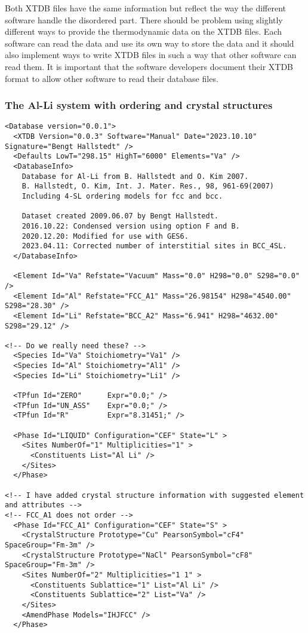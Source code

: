 \documentclass{article}
\begin{document}
\begin{appendices}
Both XTDB files have the same information but reflect the way the
different software handle the disordered part.  There should be
problem using slightly different ways to provide the thermodynamic
data on the XTDB files.  Each software can read the data and use its
own way to store the data and it should also implement ways to write
XTDB files in such a way that other software can read them.  It is
important that the software developers document their XTDB format to
allow other software to read their database files.


\subsubsection{The Al-Li system with ordering and crystal structures}\label{sec:alli1}

\begin{verbatim}
<Database version="0.0.1">
  <XTDB Version="0.0.3" Software="Manual" Date="2023.10.10" Signature="Bengt Hallstedt" />
  <Defaults LowT="298.15" HighT="6000" Elements="Va" />
  <DatabaseInfo>
    Database for Al-Li from B. Hallstedt and O. Kim 2007.
	B. Hallstedt, O. Kim, Int. J. Mater. Res., 98, 961-69(2007)
	Including 4-SL ordering models for fcc and bcc.
	
    Dataset created 2009.06.07 by Bengt Hallstedt.
    2016.10.22: Condensed version using option F and B.
    2020.12.20: Modified for use with GES6.
    2023.04.11: Corrected number of interstitial sites in BCC_4SL.
  </DatabaseInfo>

  <Element Id="Va" Refstate="Vacuum" Mass="0.0" H298="0.0" S298="0.0" />
  <Element Id="Al" Refstate="FCC_A1" Mass="26.98154" H298="4540.00" S298="28.30" />
  <Element Id="Li" Refstate="BCC_A2" Mass="6.941" H298="4632.00" S298="29.12" />

<!-- Do we really need these? -->
  <Species Id="Va" Stoichiometry="Va1" />
  <Species Id="Al" Stoichiometry="Al1" />
  <Species Id="Li" Stoichiometry="Li1" />

  <TPfun Id="ZERO"      Expr="0.0;" />
  <TPfun Id="UN_ASS"    Expr="0.0;" />
  <TPfun Id="R"         Expr="8.31451;" />

  <Phase Id="LIQUID" Configuration="CEF" State="L" >
    <Sites NumberOf="1" Multiplicities="1" >
      <Constituents List="Al Li" />
    </Sites>
  </Phase>

<!-- I have added crystal structure information with suggested element and attributes -->
<!-- FCC_A1 does not order -->
  <Phase Id="FCC_A1" Configuration="CEF" State="S" >
	<CrystalStructure Prototype="Cu" PearsonSymbol="cF4" SpaceGroup="Fm-3m" />
	<CrystalStructure Prototype="NaCl" PearsonSymbol="cF8" SpaceGroup="Fm-3m" />
    <Sites NumberOf="2" Multiplicities="1 1" >
      <Constituents Sublattice="1" List="Al Li" />
      <Constituents Sublattice="2" List="Va" />
    </Sites>
    <AmendPhase Models="IHJFCC" />
  </Phase>


\end{verbatim}
\end{appendices}
\end{document}
